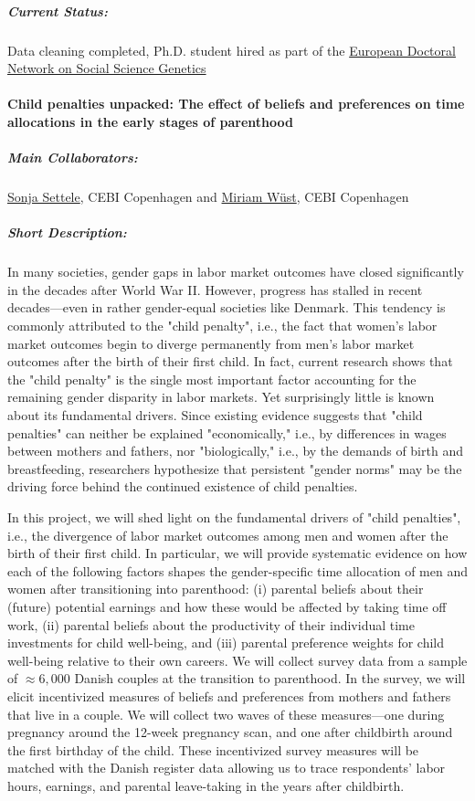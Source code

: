 \documentclass[11pt, a4paper]{article}
\begin{document}
\subparagraph{Current Status:} Data cleaning completed, Ph.D. student hired as part of the \href{https://euraxess.ec.europa.eu/worldwide/asean/europe-13-doctoral-positions-social-science-genetics-available-across-8}{European Doctoral Network on Social Science Genetics}

\paragraph{Child penalties unpacked: The effect of beliefs and preferences on time allocations in the early stages of parenthood}

\subparagraph{Main Collaborators:} \href{https://sites.google.com/prod/view/sonjasettele/startseite}{Sonja Settele}, CEBI Copenhagen and \href{https://sites.google.com/site/miriamwuestecon/home}{Miriam Wüst}, CEBI Copenhagen 

\subparagraph{Short Description:} In many societies, gender gaps in labor market outcomes have closed significantly in the decades after World War II. However, progress has stalled in recent decades---even in rather gender-equal societies like Denmark. This tendency is commonly attributed to the "child penalty", i.e., the fact that women's labor market outcomes begin to diverge permanently from men's labor market outcomes after the birth of their first child. In fact, current research shows that the "child penalty" is the single most important factor accounting for the remaining gender disparity in labor markets. Yet surprisingly little is known about its fundamental drivers. Since existing evidence suggests that "child penalties" can neither be explained "economically," i.e., by differences in wages between mothers and fathers, nor "biologically," i.e., by the demands of birth and breastfeeding, researchers hypothesize that persistent "gender norms" may be the driving force behind the continued existence of child penalties.

In this project, we will shed light on the fundamental drivers of "child penalties", i.e., the divergence of labor market outcomes among men and women after the birth of their first child. In particular, we will provide systematic evidence on how each of the following factors shapes the gender-specific time allocation of men and women after transitioning into parenthood: (i) parental beliefs about their (future) potential earnings and how these would be affected by taking time off work, (ii) parental beliefs about the productivity of their individual time investments for child well-being, and (iii) parental preference weights for child well-being relative to their own careers. We will collect survey data from a sample of $\approx6,000$ Danish couples at the transition to parenthood. In the survey, we will elicit incentivized measures of beliefs and preferences from mothers and fathers that live in a couple. We will collect two waves of these measures---one during pregnancy around the 12-week pregnancy scan, and one after childbirth around the first birthday of the child. These incentivized survey measures will be matched with the Danish register data allowing us to trace respondents' labor hours, earnings, and parental leave-taking in the years after childbirth.
\end{document}
